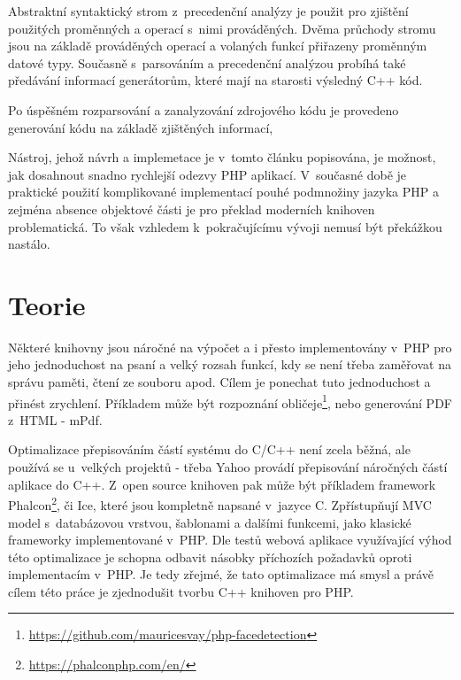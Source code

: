\documentclass[czech]{ExcelAtFIT}
\begin{document}

		Abstraktní syntaktický strom z~precedenční analýzy je použit pro zjištění použitých proměnných a operací s~nimi prováděných. Dvěma průchody stromu jsou na základě prováděných operací a volaných funkcí přiřazeny proměnným datové typy. Současně s~par\-so\-vá\-ním a precedenční analýzou probíhá také předávání informací generátorům, které mají na starosti výsledný C++ kód.

		Po úspěšném rozparsování a zanalyzování zdrojového kódu je provedeno generování kódu na základě zjištěných informací,


		Nástroj, jehož návrh a implemetace je v~tomto článku popisována, je možnost, jak dosahnout snadno rychlejší odezvy PHP aplikací. V~současné době je praktické použití komplikované implementací pouhé podmnožiny jazyka PHP a zejména absence objektové části je pro překlad moderních knihoven problematická. To však vzhledem k~pokračujícímu vývoji nemusí být překážkou nastálo.






\section{Teorie}

	Některé knihovny jsou náročné na výpočet a i přesto implementovány v~PHP pro jeho jednoduchost na psaní a velký rozsah funkcí, kdy se není třeba zaměřovat na správu paměti, čtení ze souboru apod. Cílem je ponechat tuto jednoduchost a přinést zrychlení. Pří\-kla\-dem může být rozpoznání obličeje\footnote{\url{https://github.com/mauricesvay/php-facedetection}}, nebo generování PDF z~HTML - mPdf.

	Optimalizace přepisováním částí systému do C/C++ není zcela běžná, ale používá se u~velkých projektů - třeba Yahoo provádí přepisování náročných částí aplikace do C++\cite{yahooCpp}. Z~open source knihoven pak může být příkladem framework Phalcon\footnote{\url{https://phalconphp.com/en/}}, či Ice, které jsou kompletně napsané v~jazyce C. Zpřístupňují MVC model s~databázovou vrstvou, šablonami a dalšími funkcemi, jako klasické frameworky implementované v~PHP. Dle testů\cite{phalconBenchmark} webová aplikace využívající výhod této optimalizace je schopna odbavit násobky pří\-cho\-zích požadavků oproti implementacím v~PHP. Je tedy zřejmé, že tato optimalizace má smysl a právě cílem této práce je zjednodušit tvorbu C++ knihoven pro PHP.
\end{document}

